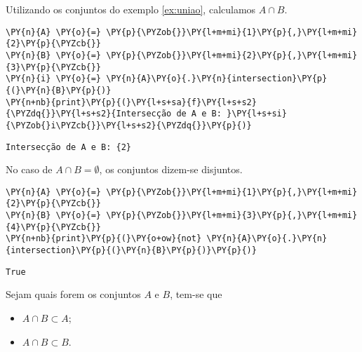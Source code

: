 \documentclass{book}
\begin{document}
        \begin{exemplo}
            Utilizando os conjuntos do exemplo \ref{ex:uniao}, calculamos $A \cap B$.


\begin{Verbatim}[commandchars=\\\{\},frame=single,fontsize=\small, xleftmargin=0.5em]
\PY{n}{A} \PY{o}{=} \PY{p}{\PYZob{}}\PY{l+m+mi}{1}\PY{p}{,}\PY{l+m+mi}{2}\PY{p}{\PYZcb{}}
\PY{n}{B} \PY{o}{=} \PY{p}{\PYZob{}}\PY{l+m+mi}{2}\PY{p}{,}\PY{l+m+mi}{3}\PY{p}{\PYZcb{}}
\PY{n}{i} \PY{o}{=} \PY{n}{A}\PY{o}{.}\PY{n}{intersection}\PY{p}{(}\PY{n}{B}\PY{p}{)}
\PY{n+nb}{print}\PY{p}{(}\PY{l+s+sa}{f}\PY{l+s+s2}{\PYZdq{}}\PY{l+s+s2}{Intersecção de A e B: }\PY{l+s+si}{\PYZob{}i\PYZcb{}}\PY{l+s+s2}{\PYZdq{}}\PY{p}{)}
\end{Verbatim}

\begin{Verbatim}[commandchars=\\\{\},frame=leftline,fontsize=\small, xleftmargin=0.5em]
Intersecção de A e B: {2}
\end{Verbatim}

        \end{exemplo}

        No caso de $A \cap B = \emptyset$, os conjuntos dizem-se disjuntos.



\begin{Verbatim}[commandchars=\\\{\},frame=single,fontsize=\small, xleftmargin=0.5em]
\PY{n}{A} \PY{o}{=} \PY{p}{\PYZob{}}\PY{l+m+mi}{1}\PY{p}{,}\PY{l+m+mi}{2}\PY{p}{\PYZcb{}}
\PY{n}{B} \PY{o}{=} \PY{p}{\PYZob{}}\PY{l+m+mi}{3}\PY{p}{,}\PY{l+m+mi}{4}\PY{p}{\PYZcb{}}
\PY{n+nb}{print}\PY{p}{(}\PY{o+ow}{not} \PY{n}{A}\PY{o}{.}\PY{n}{intersection}\PY{p}{(}\PY{n}{B}\PY{p}{)}\PY{p}{)}
\end{Verbatim}

\begin{Verbatim}[commandchars=\\\{\},frame=leftline,fontsize=\small, xleftmargin=0.5em]
True
\end{Verbatim}

        
        Sejam quais forem os conjuntos $A$ e $B$, tem-se que

        \begin{itemize}
            \item $A \cap B \subset A$;
            \item $A \cap B \subset B$.
        \end{itemize}
\end{document}
